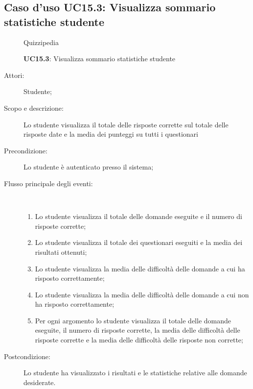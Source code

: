 \subsection{Caso d'uso UC15.3: Visualizza sommario statistiche studente}
	\begin{figure}[H]
		\centering
		\begin{resizedtikzpicture}{\textwidth}
		\begin{umlsystem}[x=0, fill=lightgray!20]{Quizzipedia}
		\end{umlsystem}
		\end{resizedtikzpicture}
		\caption{\textbf{UC15.3}: Visualizza sommario statistiche studente}
		\label{UC15.3}
	\end{figure}
\begin{description}
\item[Attori:] Studente;
\item[Scopo e descrizione:] Lo studente visualizza il totale delle risposte corrette sul totale delle risposte date e la media dei punteggi su tutti i questionari
      \item[Precondizione:] Lo studente è autenticato presso il sistema;

        \item[Flusso principale degli eventi:] \ 
 \begin{enumerate}
          \item Lo studente visualizza il totale delle domande eseguite e il numero di risposte corrette;
          \item Lo studente visualizza il totale dei questionari eseguiti e la media dei risultati ottenuti;
          \item Lo studente visualizza la media delle difficoltà delle domande a cui ha risposto correttamente;
          \item Lo studente visualizza la media delle difficoltà delle domande a cui non ha risposto correttamente;
          \item Per ogni argomento lo studente visualizza il totale delle domande eseguite, il numero di risposte corrette, la media delle difficoltà delle risposte corrette e la media delle difficoltà delle risposte non corrette;

      \end{enumerate}
    \item[Postcondizione:] Lo studente ha visualizzato i risultati e le statistiche relative alle domande desiderate.
  \end{description}
\hypertarget{UC16}{}
